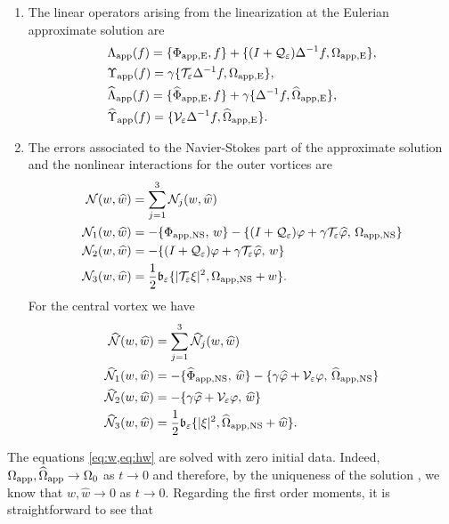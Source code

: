 \documentclass[11pt,reqno,a4paper]{amsart}
\def\eps{\varepsilon}
\newcommand{\cN}{\mathcal{N}}
\newcommand{\cQ}{\mathcal{Q}}
\newcommand{\cT}{\mathcal{T}}
\newcommand{\cV}{\mathcal{V}}
\newcommand{\app}{\mathrm{app}}
\newcommand{\1}{\mathbbm{1}}
\theoremstyle{definition}
\theoremstyle{definition}
\numberwithin{equation}{section}
\begin{document}
\begin{enumerate}
    \item The linear operators arising from the linearization at the Eulerian approximate solution  are 
\begin{align}
   \label{def:Lambdaapp} &\Lambda_{\app}(f)=\{\Phi_{\rm app, E},f\}+\{(I+\cQ_{\eps})\Delta^{-1}f,\Omega_{\rm app, E}\}, \\
\label{def:Upsilon}&\Upsilon_{\rm app}(f)=\gamma \{\cT_\eps\Delta^{-1}f,
     \Omega_{\rm app, E}\},\\
\label{def:hatLambdaapp}&\widehat{\Lambda}_{\app}(f)=\{\widehat{\Phi}_{\rm app, E},f\}+\gamma\{\Delta^{-1}f,\widehat{\Omega}_{\rm app, E}\}, \\
\label{def:hatUpsilon}&\widehat{\Upsilon}_{\rm app}(f)= \{\cV_{\eps}\Delta^{-1}f,\widehat{\Omega}_{\rm app, E}\}.
\end{align}
\item The errors associated to the Navier-Stokes part of the approximate solution and the nonlinear interactions for the outer vortices are 
\begin{align}
\label{def:N}\cN(w,\widehat{w})&=\sum_{j=1}^3\cN_j(w,\widehat{w})\\
\label{def:N1}\cN_1(w,\widehat{w})&=-\{\Phi_{\rm app,NS},\, w\}-\{(I+\cQ_{\eps})\varphi+\gamma\cT_{\eps}\widehat{\varphi},\, \Omega_{\rm app,NS}\}\\
\label{def:N2}\cN_2(w,\widehat{w})&=-\{(I+\cQ_{\eps})\varphi+\gamma \cT_{\eps}\widehat{\varphi},\, w\}\\
\label{def:N3}\cN_3(w,\widehat{w})&=\frac{1}{2}\mathfrak{b}_\eps\{|\cT_{\eps}\xi|^2,\Omega_{\rm app, NS}+w\}.
\end{align}
For the central vortex  we have
\begin{align}
\label{def:hN}
\widehat{\cN}(w,\widehat{w})&=\sum_{j=1}^3\widehat{\cN}_j(w,\widehat{w})\,\\
\label{def:hN2}\widehat{\cN}_1(w,\widehat{w})&=-\{\widehat{\Phi}_{\rm app,NS},\, \widehat{w}\}-\{\gamma\widehat{\varphi}+\cV_{\eps}\varphi,\, \widehat{\Omega}_{\rm app,NS}\}\\
\label{def:hN3}\widehat{\cN}_2(w,\widehat{w})&=-\{\gamma\widehat{\varphi}+ \cV_{\eps}\varphi,\, \widehat{w}\}\\
\label{def:hN4}\widehat{\cN}_3(w,\widehat{w})&=\frac{1}{2}\mathfrak{b}_\eps\{|\xi|^2,\widehat{\Omega}_{\rm app, NS}+\widehat{w}\}.
\end{align}
\end{enumerate}
The equations \cref{eq:w,eq:hw} are solved with zero initial data. Indeed,  $\Omega_{\rm app},\widehat{\Omega}_{\rm app}\to \Omega_0$ as $t\to 0$ and therefore, by the uniqueness of the solution \cite{GaGa2005}, we know that $w,\widehat{w}\to 0$ as $t\to0$. Regarding the first order moments, it is straightforward to see that
\end{document}
